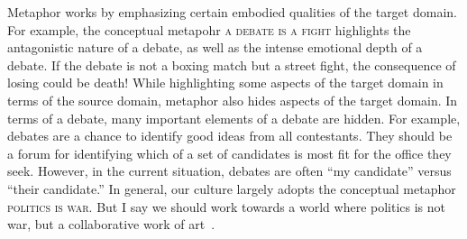 Metaphor works by emphasizing certain embodied qualities of the target domain.
For example, the conceptual metapohr \textsc{a debate is a fight} highlights
the antagonistic nature of a debate, as well as the intense emotional depth
of a debate. If the debate is not a boxing match but a street fight, the 
consequence of losing could be death! While highlighting some aspects of the
target domain in terms of the source domain, metaphor also hides aspects of
the target domain. In terms of a debate, many important elements of a debate
are hidden. For example, debates are a chance to identify good ideas from all
contestants. They should be a forum for identifying which of a set of candidates
is most fit for the office they seek. However, in the current situation, 
debates are often ``my candidate'' versus ``their candidate.'' 
In general, our culture largely adopts the conceptual metaphor \textsc{politics
is war}. But I say we should work towards a world where politics is not war, 
but a collaborative work of art~\cite[p. 139]{Lakoff1980}.
